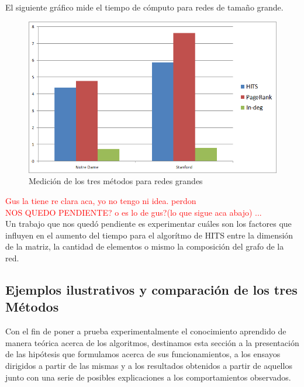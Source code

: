 \documentclass[a4paper]{article}
\begin{document}
El siguiente gr\'afico mide el tiempo de c\'omputo para redes de tama\~no grande.\\
\begin{figure}[h!]
  \begin{center}
	\includegraphics[scale=0.50]{imagenes/expTiempo/tiemposGrandes.png}
	\caption{Medici\'on de los tres m\'etodos para redes grandes}
	\label{nombreparareferenciar}
  \end{center}
\end{figure}

\textcolor{red}{Gus la tiene re clara aca, yo no tengo ni idea. perdon \\
NOS QUEDO PENDIENTE? o es lo de gus?(lo que sigue aca abajo) ...} \\
Un trabajo que nos qued\'o pendiente es experimentar cu\'ales son los factores que influyen en el aumento del tiempo para el algor\'itmo de HITS entre la dimensi\'on de la matriz, la cantidad de elementos o mismo la composici\'on del grafo de la red. \\
\newpage

\subsection{Ejemplos ilustrativos y comparaci\'on de los tres M\'etodos}


Con el fin de poner a prueba experimentalmente el conocimiento aprendido de manera teórica acerca de los algoritmos, destinamos esta sección a la presentación de las hipótesis que formulamos acerca de sus funcionamientos, a los ensayos dirigidos a partir de las mismas y a los resultados obtenidos a partir de aquellos junto con una serie de posibles explicaciones a los comportamientos observados.
\end{document}

